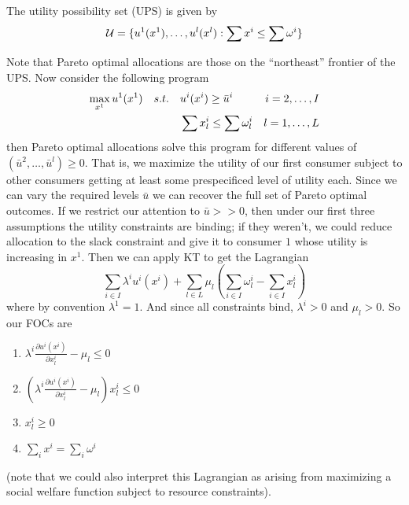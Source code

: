 \begin{definition}
  The utility possibility set (UPS) is given by
  \[
  {\cal U} = \{u^1(x^1), \dots, u^l(x^l) : \sum x^i \leq \sum \omega^i \}
  \]
\end{definition}

Note that Pareto optimal allocations are those on the ``northeast''
frontier of the UPS. Now consider the following program
\begin{align}
  \max_{x^1} u^1(x^1) \quad s.t. & \quad u^i(x^i) \geq \bar u^i 
  & i = 2, \dots, I \notag \\
  & \quad \sum x^i_l \leq \sum \omega^i_l & l = 1, \dots, L \notag
\end{align}
then Pareto optimal allocations solve this program for different
values of $(\bar u^2, \dots, \bar u^l) \geq 0$. That is, we maximize
the utility of our first consumer subject to other consumers getting
at least some prespecificed level of utility each. Since we can vary
the required levels $\bar u$ we can recover the full set of Pareto
optimal outcomes. If we restrict our attention to $\bar u >> 0$, then
under our first three assumptions the utility constraints are binding;
if they weren't, we could reduce allocation to the slack constraint
and give it to consumer $1$ whose utility is increasing in $x^1$. Then
we can apply KT to get the Lagrangian
\[
\sum_{i \in I} \lambda^iu^i(x^i) 
+ \sum_{l \in L} \mu_l \left( \sum_{i \in I}\omega^i_l -  \sum_{i \in I} x^i_l \right)
\]
where by convention $\lambda^1 = 1$. And since all constraints bind,
$\lambda^i > 0$ and $\mu_l > 0$. So our FOCs are
\begin{enumerate}
\item $\lambda^i \frac{\partial u^i(x^i)}{\partial x^i_l} - \mu_l \leq 0$
\item $\left(\lambda^i \frac{\partial u^i(x^i)}{\partial x^i_l} -
    \mu_l\right)x^i_l \leq 0$
\item $x^i_l \geq 0$
\item $\sum_i x^i = \sum_i \omega^i$
\end{enumerate}
(note that we could also interpret this Lagrangian as arising from
maximizing a social welfare function subject to resource constraints).

